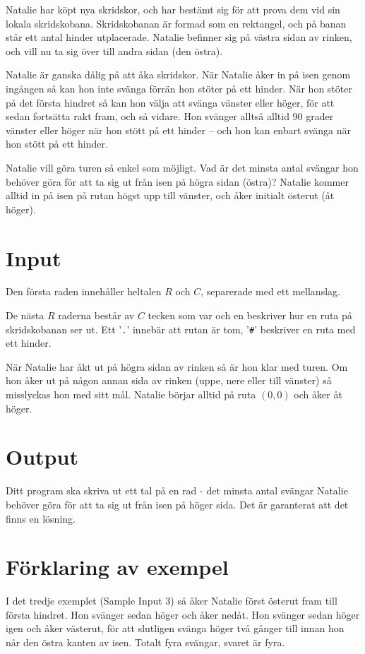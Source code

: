Natalie har köpt nya skridskor, och har bestämt sig för att prova dem vid sin
lokala skridskobana. Skridskobanan är formad som en rektangel, och på banan
står ett antal hinder utplacerade. Natalie befinner sig på västra sidan av rinken,
och vill nu ta sig över till andra sidan (den östra).

Natalie är ganska dålig på att åka skridskor. När Natalie åker in på isen
genom ingången så kan hon inte svänga förrän hon stöter på ett hinder. När hon
stöter på det första hindret så kan hon välja att svänga vänster eller höger,
för att sedan fortsätta rakt fram, och så vidare. Hon svänger alltså alltid
90 grader vänster eller höger när hon stött på ett hinder -- och hon kan enbart svänga
när hon stött på ett hinder.

Natalie vill göra turen så enkel som möjligt. Vad är det minsta antal svängar
hon behöver göra för att ta sig ut från isen på högra sidan (östra)?
Natalie kommer alltid in på isen på rutan högst upp till vänster, och åker
initialt österut (åt höger).

\section*{Input}
Den första raden innehåller heltalen $R$ och $C$,
separerade med ett mellanslag.

De nästa $R$ raderna består av $C$ tecken som var och en beskriver hur en ruta
på skridskobanan ser ut. Ett '\texttt{.}' innebär att rutan är tom,
'\texttt{\#}' beskriver en ruta med ett hinder.

När Natalie har åkt ut på högra sidan av rinken så är hon klar med turen. Om hon åker
ut på någon annan sida av rinken (uppe, nere eller till vänster) så misslyckas hon med
sitt mål. Natalie börjar alltid på ruta $(0,0)$ och åker åt höger.

\section*{Output}
Ditt program ska skriva ut ett tal på en rad - det minsta antal svängar Natalie
behöver göra för att ta sig ut från isen på höger sida. Det är garanterat att
det finns en lösning.

\section*{Förklaring av exempel}
I det tredje exemplet (Sample Input 3) så åker Natalie först österut fram till första hindret. Hon
svänger sedan höger och åker nedåt. Hon svänger sedan höger igen och åker västerut, för att slutligen
svänga höger två gånger till innan hon når den östra kanten av isen. Totalt fyra svängar, svaret är fyra.

